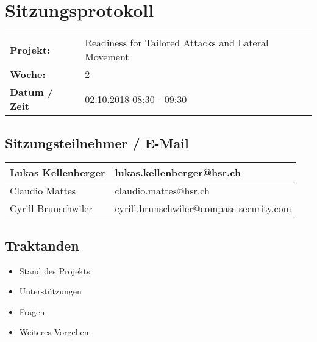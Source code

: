 \newcommand{\TITLE}{Readiness for Tailored Attacks and Lateral Movement Detection}
\newcommand{\REVIEW}{Weekly Meeting}
\newcommand{\VERSION}{0.0}





\section*{Sitzungsprotokoll}

\begin{tabular}{p{4cm} p{12cm}}
    \textbf{Projekt:} & Readiness for Tailored Attacks and Lateral Movement  \\
    \textbf{Woche:} & 2 \\
    \textbf{Datum / Zeit} & 02.10.2018 08:30 - 09:30 \\
\end{tabular}

\subsection*{Sitzungsteilnehmer / E-Mail}
\begin{table}[H]
    \centering
    \begin{tabular}{p{4cm} p{12cm}} \hline
        Lukas Kellenberger & lukas.kellenberger@hsr.ch \\ \hline
        Claudio Mattes & claudio.mattes@hsr.ch \\ \hline
        Cyrill Brunschwiler & cyrill.brunschwiler@compass-security.com \\ \hline
    \end{tabular}
\end{table}

\vspace{1cm}

\subsection*{Traktanden}
\begin{itemize}
    \item Stand des Projekts
    \item Unterstützungen
    \item Fragen
    \item Weiteres Vorgehen
\end{itemize}

\clearpage


